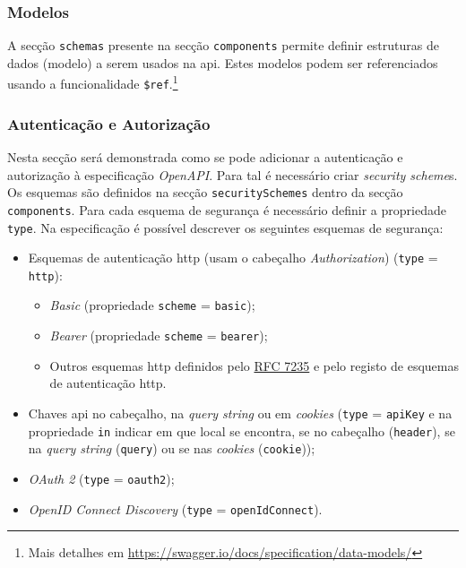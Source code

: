 \vspace{-0.7cm}

\subsubsection{Modelos}
A secção \texttt{schemas} presente na secção \texttt{components} permite definir estruturas de dados 
(modelo) a serem usados na \acrshort{api}. 
Estes modelos podem ser referenciados usando a funcionalidade \texttt{\$ref}.\footnote{Mais detalhes em \url{https://swagger.io/docs/specification/data-models/}}

\subsubsection{Autenticação e Autorização}\label{sec:authSwagger}
Nesta secção será demonstrada como se pode adicionar a autenticação e autorização à especificação \textit{OpenAPI}. 
Para tal é necessário criar \textit{security scheme}s. Os esquemas são definidos na secção 
\texttt{securitySchemes} dentro da secção \texttt{components}. 
Para cada esquema de segurança é necessário definir a propriedade \texttt{type}. 
Na especificação é possível descrever os seguintes esquemas de segurança:
\begin{itemize}
    \item Esquemas de autenticação \acrshort{http} (usam o cabeçalho \textit{Authorization}) (\texttt{type} = \texttt{http}):
    \begin{itemize}
        \item \textit{Basic} (propriedade \texttt{scheme} = \texttt{basic});
        \item \textit{Bearer} (propriedade \texttt{scheme} = \texttt{bearer});
        \item Outros esquemas \acrshort{http} definidos pelo \href{https://tools.ietf.org/html/rfc7235}{RFC 7235} 
        e pelo registo de esquemas de autenticação \acrshort{http}.
    \end{itemize}
    \item Chaves \acrshort{api} no cabeçalho, na \textit{query string} ou em \textit{cookies} 
    (\texttt{type} = \texttt{apiKey} e na propriedade \texttt{in} indicar em que local se encontra, se no 
    cabeçalho (\texttt{header}), se na \textit{query string} (\texttt{query}) ou se nas \textit{cookies} 
    (\texttt{cookie}));
    \item \textit{OAuth 2} (\texttt{type} = \texttt{oauth2});
    \item \textit{OpenID Connect Discovery} (\texttt{type} = \texttt{openIdConnect}).
\end{itemize}

